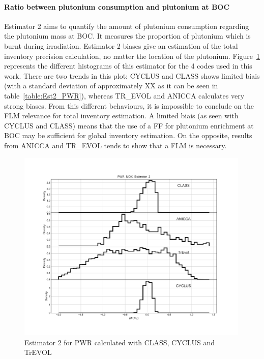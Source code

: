 \paragraph{Ratio between plutonium consumption and plutonium at BOC}
Estimator 2 aims to quantify the amount of plutonium consumption regarding the plutonium mass at BOC. It measures the proportion of plutonium which is burnt during irradiation. Estimator 2 biases give an estimation of the total inventory precision calculation, no matter the location of the plutonium. 
Figure~\ref{fig:Est2_PWR} represents the different histograms of this estimator for the 4 codes used in this work. There are two trends in this plot: CYCLUS and CLASS shows limited biais (with a standard deviation of approximately XX as it can be seen in table~\ref{table:Est2_PWR}), whereas TR_EVOL and ANICCA calculates very strong biases. From this different behaviours, it is impossible to conclude on the FLM relevance for total inventory estimation. A limited biais (as seen with CYCLUS and CLASS) means that the use of a FF for plutonium enrichment at BOC may be sufficient for global inventory estimation. On the opposite, results from ANICCA and TR_EVOL tends to show that a FLM is necessary. 

\begin{figure}[h]
	\begin{center}
		\includegraphics[width = 0.99\textwidth]{../../Feature_1/RAW_DATA/FIG/PWR_MOX_Estimator_2.pdf}
		\caption{Estimator 2 for PWR calculated with CLASS, CYCLUS and TrEVOL}
		\label{fig:Est2_PWR}
	\end{center}
\end{figure}


